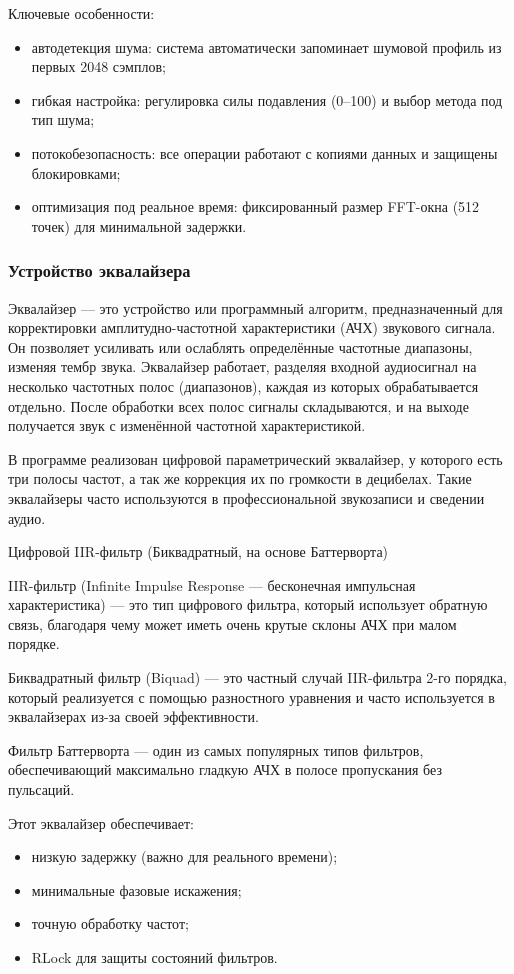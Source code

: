 Ключевые особенности:
\begin{itemize}
	\item автодетекция шума: система автоматически запоминает шумовой профиль из первых 2048 сэмплов;
	\item гибкая настройка: регулировка силы подавления (0–100) и выбор метода под тип шума;
	\item потокобезопасность: все операции работают с копиями данных и защищены блокировками;
	\item оптимизация под реальное время: фиксированный размер FFT-окна (512 точек) для минимальной задержки.
\end{itemize}

\subsubsection{Устройство эквалайзера}

Эквалайзер — это устройство или программный алгоритм, предназначенный для корректировки амплитудно-частотной характеристики (АЧХ) звукового сигнала. Он позволяет усиливать или ослаблять определённые частотные диапазоны, изменяя тембр звука. Эквалайзер работает, разделяя входной аудиосигнал на несколько частотных полос (диапазонов), каждая из которых обрабатывается отдельно. После обработки всех полос сигналы складываются, и на выходе получается звук с изменённой частотной характеристикой.

В программе реализован цифровой параметрический эквалайзер, у которого есть три полосы частот, а так же коррекция их по громкости в децибелах. Такие эквалайзеры часто используются в профессиональной звукозаписи и сведении аудио.

Цифровой IIR-фильтр (Биквадратный, на основе Баттерворта)

IIR-фильтр (Infinite Impulse Response — бесконечная импульсная характеристика) — это тип цифрового фильтра, который использует обратную связь, благодаря чему может иметь очень крутые склоны АЧХ при малом порядке.

Биквадратный фильтр (Biquad) — это частный случай IIR-фильтра 2-го порядка, который реализуется с помощью разностного уравнения и часто используется в эквалайзерах из-за своей эффективности.

Фильтр Баттерворта — один из самых популярных типов фильтров, обеспечивающий максимально гладкую АЧХ в полосе пропускания без пульсаций.

Этот эквалайзер обеспечивает:
\begin{itemize}
	\item низкую задержку (важно для реального времени);
	\item минимальные фазовые искажения;
	\item точную обработку частот;
	\item RLock для защиты состояний фильтров.
\end{itemize}

